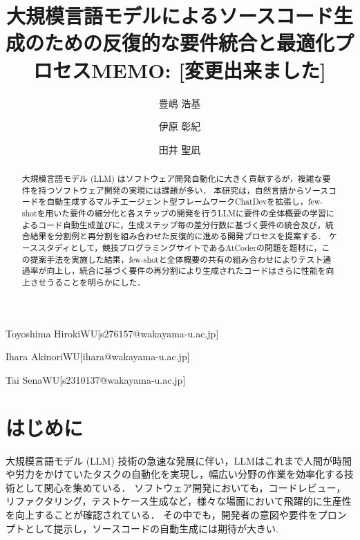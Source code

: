 \documentclass[submit,techrep,noauthor]{ipsj}
\newcommand{\memo}[1]{\colorbox{magenta!30}{{\bf MEMO}:}{\color{red!50} {\textbf{[#1]}}}}
\begin{document}
\title{大規模言語モデルによるソースコード生成のための反復的な要件統合と最適化プロセス\memo{変更出来ました}}




\author{豊嶋 浩基}{Toyoshima Hiroki}{WU}[s276157@wakayama-u.ac.jp]
\author{伊原 彰紀}{Ihara Akinori}{WU}[ihara@wakayama-u.ac.jp]
\author{田井 聖凪}{Tai Sena}{WU}[s2310137@wakayama-u.ac.jp]

\begin{abstract}
大規模言語モデル (LLM) はソフトウェア開発自動化に大きく貢献するが，複雑な要件を持つソフトウェア開発の実現には課題が多い．
本研究は，自然言語からソースコードを自動生成するマルチエージェント型フレームワークChatDevを拡張し，few-shotを用いた要件の細分化と各ステップの開発を行うLLMに要件の全体概要の学習によるコード自動生成並びに，生成ステップ毎の差分行数に基づく要件の統合及び，統合結果を分割例と再分割を組み合わせた反復的に進める開発プロセスを提案する．
ケーススタディとして，競技プログラミングサイトであるAtCoderの問題を題材に，この提案手法を実施した結果，few-shotと全体概要の共有の組み合わせによりテスト通過率が向上し，統合に基づく要件の再分割により生成されたコードはさらに性能を向上させうることを明らかにした．

\end{abstract}

\maketitle

\section{はじめに}

大規模言語モデル (LLM) 技術の急速な発展に伴い\cite{Growing_LLM}，LLMはこれまで人間が時間や労力をかけていたタスクの自動化を実現し，幅広い分野の作業を効率化する技術として関心を集めている．
ソフトウェア開発においても，コードレビュー，リファクタリング，テストケース生成など，様々な場面において飛躍的に生産性を向上することが確認されている\cite{LLM_CodeReview}\cite{LLM_Refactoring}\cite{LLM_Gene_Test}．
その中でも，開発者の意図や要件をプロンプトとして提示し，ソースコードの自動生成には期待が大きい\cite{LLM_CodeGeneration}.
\end{document}
